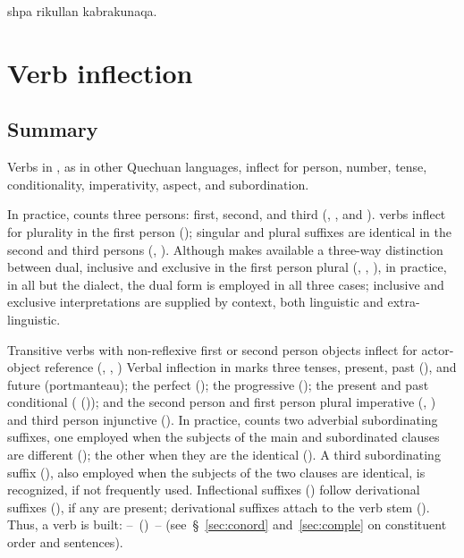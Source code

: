 %
{shpa rikullan kabrakunaqa.}%
{}%
{}{}%

\section{Verb inflection}
\subsection{Summary}\label{sec:verbs summary}
Verbs in \SYQ, as in other Quechuan languages, inflect for person, number, tense, conditionality, imperativity, aspect, and subordination. 

In practice, \SYQ{} counts three persons: first, second, and third (, , and ). \SYQ{} verbs inflect for plurality in the first person (); singular and plural suffixes are identical in the second and third persons (, ). Although \SYQ{} makes available a three-way distinction between dual, inclusive and exclusive in the first person plural (, , ), in practice, in all but the \CH{} dialect, the dual form is employed in all three cases; inclusive and exclusive interpretations are supplied by context, both linguistic and extra-linguistic. 

Transitive verbs with non-reflexive first or second person objects inflect for actor-object reference (, , \etc) Verbal inflection in \SYQ{} marks three tenses, present, past (), and future (portmanteau); the perfect (); the progressive (); the present and past conditional ( ()); and the second person and first person plural imperative (, ) and third person injunctive (). In practice, \SYQ{} counts two adverbial subordinating suffixes, one employed when the subjects of the main and subordinated clauses are different (); the other when they are the identical (). A third subordinating suffix (), also employed when the subjects of the two clauses are identical, is recognized, if not frequently used. Inflectional suffixes () follow derivational suffixes (), if any are present; derivational suffixes attach to the verb stem (). Thus, a \SYQ{} verb is built:  --~()~--  (see~§~\ref{sec:conord} and~\ref{sec:comple} on constituent order and sentences).

